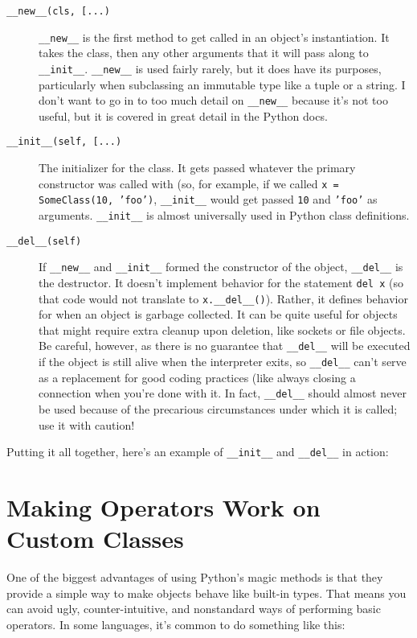 \documentclass[a4paper,11pt]{article}
\newcommand{\code}[1]{\texttt{#1}}
\begin{document}
\begin{description}

\item[\code{__new__(cls, [...)}]
\code{__new__} is the first method to get called in an object's instantiation. It takes the class, then any other arguments that it will pass along to \code{__init__}. \code{__new__} is used fairly rarely, but it does have its purposes, particularly when subclassing an immutable type like a tuple or a string. I don't want to go in to too much detail on \code{__new__} because it's not too useful, but it is covered in great detail in the Python docs.
\item[\code{__init__(self, [...)}]
The initializer for the class. It gets passed whatever the primary constructor was called with (so, for example, if we called \code{x = SomeClass(10, 'foo')}, \code{__init__} would get passed \code{10} and \code{'foo'} as arguments. \code{__init__} is almost universally used in Python class definitions.
\item[\code{__del__(self)}]
If \code{__new__} and \code{__init__} formed the constructor of the object, \code{__del__} is the destructor. It doesn't implement behavior for the statement \code{del x} (so that code would not translate to \code{x.__del__()}). Rather, it defines behavior for when an object is garbage collected. It can be quite useful for objects that might require extra cleanup upon deletion, like sockets or file objects. Be careful, however, as there is no guarantee that \code{__del__} will be executed if the object is still alive when the interpreter exits, so \code{__del__} can't serve as a replacement for good coding practices (like always closing a connection when you're done with it.  In fact, \code{__del__} should almost never be used because of the precarious circumstances under which it is called; use it with caution!

\end{description}

\noindent
Putting it all together, here's an example of \code{__init__} and \code{__del__} in action:



\section{Making Operators Work on Custom Classes}

One of the biggest advantages of using Python's magic methods is that they provide a simple way to make objects behave like built-in types. That means you can avoid ugly, counter-intuitive, and nonstandard ways of performing basic operators. In some languages, it's common to do something like this:
\end{document}
